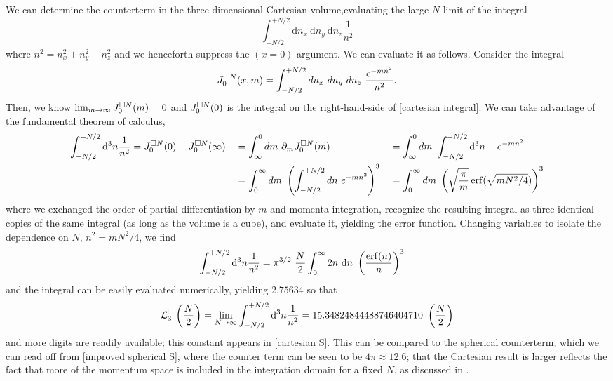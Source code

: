 We can determine the counterterm in the three-dimensional Cartesian volume,evaluating the large-$N$ limit of the integral
\begin{equation}\label{eq:cartesian integral}
    \int_{-N/2}^{+N/2} \mathrm{d}n_x\ \mathrm{d}n_y\ \mathrm{d}n_z \frac{1}{n^2}
\end{equation}
where $n^2 = n_x^2+n_y^2+n_z^2$ and we henceforth suppress the $(x=0)$ argument.
We can evaluate it as follows.  Consider the integral
\begin{equation}
	J^{\square N}_0(x, m) = \int_{-N/2}^{+N/2} dn_x\ dn_y\ dn_z\ \frac{e^{-m n^2}}{n^2}.
\end{equation}
Then, we know $\lim_{m\rightarrow\infty} J^{\square N}_0(m) = 0$ and $J^{\square N}_0(0)$ is the integral on the right-hand-side of \eqref{cartesian integral}.
We can take advantage of the fundamental theorem of calculus,
\begin{align}
	\int_{-N/2}^{+N/2} \mathrm{d}^3n \frac{1}{n^2}
    &=
    J^{\square N}_0(0) - J^{\square N}_0(\infty)
		&&= 	\int_{\infty}^{0} dm\ \partial_m J^{\square N}_0(m)
		&&=	\int_{\infty}^{0} dm\ \int_{-N/2}^{+N/2} \mathrm{d}^3n -e^{-m n^2}
		\nonumber\\
		&&&=	\int_0^\infty dm\ \left(\int_{-N/2}^{+N/2} dn\ e^{-m n^2}\right)^3
		&&=	\int_0^\infty dm\ \left(\sqrt{\frac{\pi}{m}} \operatorname{erf}(\sqrt{m N^2/4})\right)^3
\end{align}
where we exchanged the order of partial differentiation by $m$ and momenta integration, recognize the resulting integral as three identical copies of the same integral (as long as the volume is a cube), and evaluate it, yielding the error function.
Changing variables to isolate the dependence on $N$, $n^2 = m N^2/4$, we find
\begin{align}
    \int_{-N/2}^{+N/2} \mathrm{d}^3n \frac{1}{n^2}
    &=
    \pi^{3/2}\ \frac{N}{2} \int_{0}^\infty 2n\ \mathrm{d}n\ \left(\frac{\operatorname{erf}(n)}{n}\right)^3
\end{align}
and the integral can be easily evaluated numerically, yielding $2.75634$ so that
\begin{equation}
    \mathcal{L}^\square_3 \left(\frac{N}{2}\right) = \lim_{N\rightarrow\infty}\int_{-N/2}^{+N/2} \mathrm{d}^3n \frac{1}{n^2} = 15.34824844488746404710\ \left(\frac{N}{2}\right)
\end{equation}
and more digits are readily available; this constant appears in \eqref{cartesian S}.
This can be compared to the spherical counterterm, which we can read off from \eqref{improved spherical S}, where the counter term can be seen to be $4\pi \approx 12.6 $; that the Cartesian result is larger reflects the fact that more of the momentum space is included in the integration domain for a fixed $N$, as discussed in .

